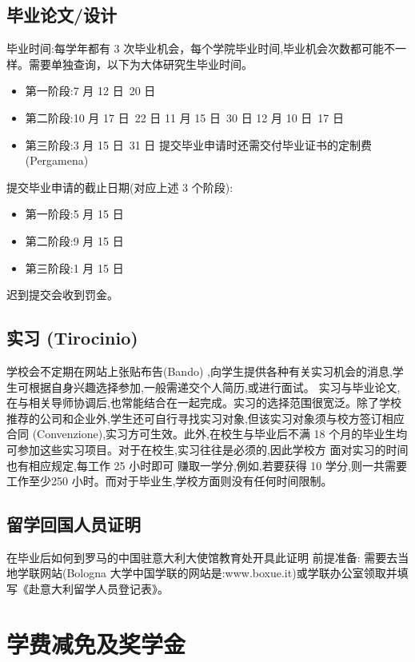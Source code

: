 \subsection{毕业论文/设计}

毕业时间:每学年都有 3 次毕业机会，每个学院毕业时间,毕业机会次数都可能不一样。需要单独查询，以下为大体研究生毕业时间。
\begin{itemize}
\item 第一阶段:7 月 12 日~20 日
\item 第二阶段:10 月 17 日~22 日 11 月 15 日~30 日 12 月 10 日~17 日
\item 第三阶段:3 月 15 日~31 日
提交毕业申请时还需交付毕业证书的定制费 (Pergamena) 
\end{itemize}

\noindent 提交毕业申请的截止日期(对应上述 3 个阶段): 
\begin{itemize}
\item 第一阶段:5 月 15 日
\item 第二阶段:9 月 15 日
\item 第三阶段:1 月 15 日 
\end{itemize}
迟到提交会收到罚金。

\subsection{实习 (Tirocinio)}
学校会不定期在网站上张贴布告(Bando) ,向学生提供各种有关实习机会的消息,学生可根据自身兴趣选择参加,一般需递交个人简历,或进行面试。 实习与毕业论文,在与相关导师协调后,也常能结合在一起完成。实习的选择范围很宽泛。除了学校推荐的公司和企业外,学生还可自行寻找实习对象,但该实习对象须与校方签订相应合同 (Convenzione),实习方可生效。此外,在校生与毕业后不满 18 个月的毕业生均可参加这些实习项目。对于在校生,实习往往是必须的,因此学校方 面对实习的时间也有相应规定,每工作 25 小时即可 
赚取一学分,例如,若要获得 10 学分,则一共需要工作至少250 小时。而对于毕业生,学校方面则没有任何时间限制。 
\subsection{留学回国人员证明}
在毕业后如何到罗马的中国驻意大利大使馆教育处开具此证明 
前提准备: 需要去当地学联网站(Bologna 大学中国学联的网站是:www.boxue.it)或学联办公室领取并填写《赴意大利留学人员登记表》。

\section{学费减免及奖学金}

